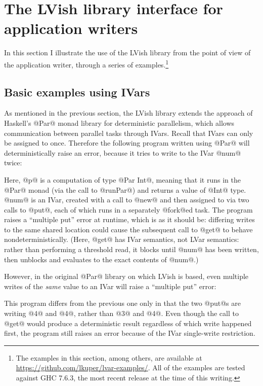 \section{The LVish library interface for application writers}\label{s:lvish-api}

In this section I illustrate the use of the LVish library from the
point of view of the application writer, through a series of
examples.\footnote{The examples in this section, among others, are
  available at \url{https://github.com/lkuper/lvar-examples/}.  All of
  the examples are tested against GHC 7.6.3, the most recent release
  at the time of this writing.}

\subsection{Basic examples using IVars}

As mentioned in the previous section, the LVish library extends the
approach of Haskell's @Par@ monad library for deterministic
parallelism, which allows communication between parallel tasks through
IVars.  Recall that IVars can only be assigned to once.  Therefore the
following program written using @Par@ will deterministically raise an
error, because it tries to write to the IVar @num@ twice:

\singlespacing

\doublespacing

Here, @p@ is a computation of type @Par Int@, meaning that it runs in
the @Par@ monad (via the call to @runPar@) and returns a value of
@Int@ type.  @num@ is an IVar, created with a call to @new@ and then
assigned to via two calls to @put@, each of which runs in a separately
@fork@ed task.  The program raises a ``multiple put'' error at
runtime, which is as it should be: differing writes to the same shared
location could cause the subsequent call to @get@ to behave
nondeterministically.  (Here, @get@ has IVar semantics, not LVar
semantics: rather than performing a threshold read, it blocks until
@num@ has been written, then unblocks and evaluates to the exact
contents of @num@.)

However, in the original @Par@ library on which LVish is based, even
multiple writes of the \emph{same} value to an IVar will raise a
``multiple put'' error:

\singlespacing

\doublespacing

This program differs from the previous one only in that the two @put@s
are writing @4@ and @4@, rather than @3@ and @4@.  Even though the
call to @get@ would produce a deterministic result regardless of which
write happened first, the program still raises an error because of the
IVar single-write restriction.


